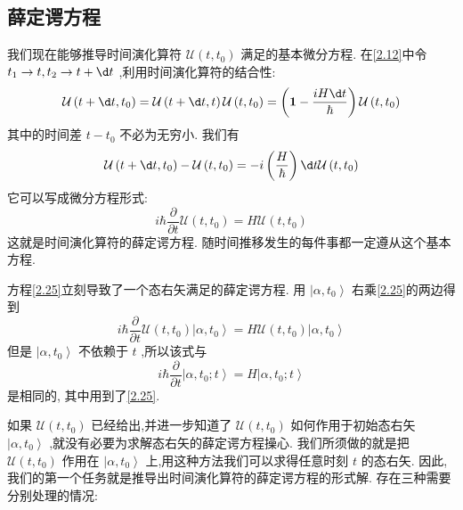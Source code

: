 \subsection{薛定谔方程}

我们现在能够推导时间演化算符 $\mathcal{U}\left( {t,{t}_{0}}\right)$ 满足的基本微分方程. 在\ref{2.12}中令 ${t}_{1} \rightarrow t,{t}_{2} \rightarrow t + {\d t}$ ,利用时间演化算符的结合性:
\begin{equation}
	\mathcal{U}\left( {t + {\d t},{t}_{0}}\right) = \mathcal{U}\left( {t + {\d t}, t}\right) \mathcal{U}\left( {t,{t}_{0}}\right) = \left( {\textbf{1} - \frac{iH\d t}{\hbar }}\right) \mathcal{U}\left( {t,{t}_{0}}\right)
\end{equation}
其中的时间差 $t - {t}_{0}$ 不必为无穷小. 我们有
\begin{equation}
	\mathcal{U}\left( {t + {\d t},{t}_{0}}\right) - \mathcal{U}\left( {t,{t}_{0}}\right) = - i\left( \frac{H}{\hbar }\right) {\d t}\mathcal{U}\left( {t,{t}_{0}}\right)
\end{equation}
它可以写成微分方程形式:
\begin{equation}\label{2.25}
	i\hbar \frac{\partial }{\partial t}\mathcal{U}\left( {t,{t}_{0}}\right) = {H\mathcal{U}}\left( {t,{t}_{0}}\right)
\end{equation}
这就是时间演化算符的薛定谔方程. 随时间推移发生的每件事都一定遵从这个基本方程.

方程\ref{2.25}立刻导致了一个态右矢满足的薛定谔方程. 用 $\left| {\alpha ,{t}_{0}}\right\rangle$ 右乘\ref{2.25}的两边得到
\begin{equation}
	i\hbar \frac{\partial }{\partial t}\mathcal{U}\left( {t,{t}_{0}}\right) \left| {\alpha ,{t}_{0}}\right\rangle = {H\mathcal{U}}\left( {t,{t}_{0}}\right) \left| {\alpha ,{t}_{0}}\right\rangle
\end{equation}
但是 $\left| {\alpha ,{t}_{0}}\right\rangle$ 不依赖于 $t$ ,所以该式与
\begin{equation}\label{2.27}
	i\hbar \frac{\partial }{\partial t}\left| {\alpha ,{t}_{0};t}\right\rangle = H\left| {\alpha ,{t}_{0};t}\right\rangle
\end{equation}
是相同的, 其中用到了\ref{2.25}.

如果 $\mathcal{U}\left( {t,{t}_{0}}\right)$ 已经给出,并进一步知道了 $\mathcal{U}\left( {t,{t}_{0}}\right)$ 如何作用于初始态右矢 $\left| {\alpha ,{t}_{0}}\right\rangle$ ,就没有必要为求解态右矢的薛定谔方程操心. 我们所须做的就是把 $\mathcal{U}\left( {t,{t}_{0}}\right)$ 作用在 $\left| {\alpha ,{t}_{0}}\right\rangle$ 上,用这种方法我们可以求得任意时刻 $t$ 的态右矢. 因此,我们的第一个任务就是推导出时间演化算符的薛定谔方程的形式解. 存在三种需要分别处理的情况:

